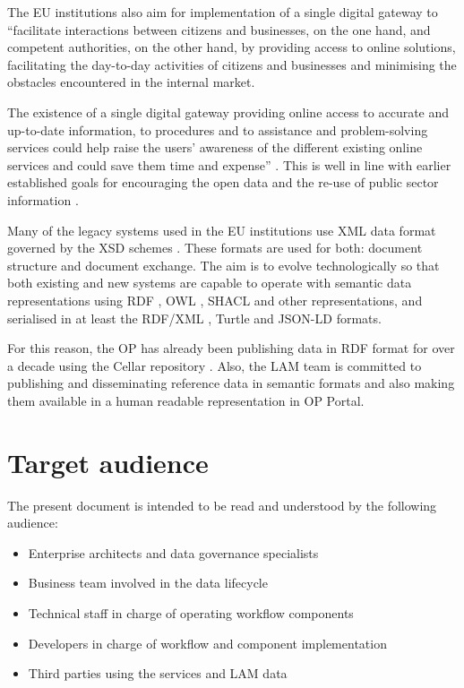 	The EU institutions also aim for implementation of a single digital gateway to ``facilitate interactions between citizens and businesses, on the one hand, and competent authorities, on the other hand, by providing access to online solutions, facilitating the day-to-day activities of citizens and businesses and minimising the obstacles encountered in the internal market. 
	
	The existence of a single digital gateway providing online access to accurate and up-to-date information, to procedures and to assistance and problem-solving services could help raise the users' awareness of the different existing online services and could save them time and expense'' \citep{directive-2018/1724}. This is well in line with earlier established goals for encouraging the open data and the re-use of public sector information \citep{directive-2013/37/EU,directive-2019/1024}.

	Many of the legacy systems used in the EU institutions use XML data format governed by the XSD schemes \citep{xsd1.1-spec}. These formats are used for both: document structure and document exchange. The aim is to evolve technologically so that both existing and new systems are capable to operate with semantic data representations using RDF \citep{rdf11}, OWL \citep{owl2.0,owl2}, SHACL \citep{shacl-spec} and other representations, and serialised in at least the RDF/XML \citep{rdf-xml-Beckett:04:RSS,rdf-xml-Schreiber:14:RXS}, Turtle \citep{turtle-Carothers:14:RT} and JSON-LD \citep{spornyjson,sporny2014json} formats.
	
	For this reason, the OP has already been publishing data in RDF format for over a decade using the Cellar repository \citep{cdm-francesconi2015ontology}. Also, the LAM team is committed to publishing and disseminating reference data in semantic formats and also making them available in a human readable representation in OP Portal.
	
	\section{Target audience}
	\label{sec:audience}
	The present document is intended to be read and understood by the following audience:	
	\begin{itemize}
		\item Enterprise architects and data governance specialists
		\item Business team involved in the data lifecycle
		\item Technical staff in charge of operating workflow components
		\item Developers in charge of workflow and component implementation
		\item Third parties using the services and LAM data
	\end{itemize}	
	
